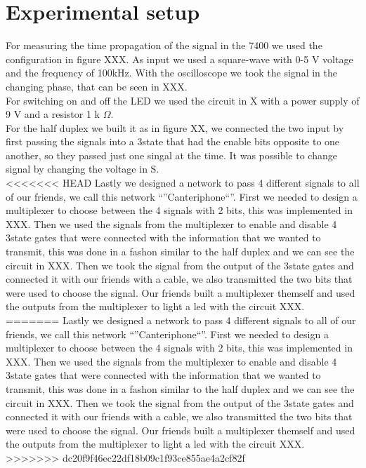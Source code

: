 \section{Experimental setup}
For measuring the time propagation of the signal in the 7400 we used the configuration in figure XXX. As input we used a square-wave with 0-5 V voltage and the frequency of 100kHz. With the oscilloscope we took the signal in the changing phase, that can be seen in XXX.\\
For switching on and off the LED we used the circuit in X with a power supply of 9 V and a resistor 1  k $\Omega$.\\
For the half duplex we built it as in figure XX, we connected the two input by first passing the signals into a  3state that had the enable bits opposite to one another, so they passed just one singal at the time. It was possible to change signal by changing the voltage in S.\\
<<<<<<< HEAD
Lastly we designed a network to pass 4 different signals to all of our friends, we call this network ``''Canteriphone``''. First we needed to design a multiplexer to choose between the 4 signals with 2 bits, this was implemented in XXX. Then we used the signals from the multiplexer to enable and disable 4 3state gates that were connected with the information that we wanted to transmit, this was done in a fashon similar to the half duplex and we can see the circuit in XXX. Then we took the signal from the output of the 3state gates and connected it with our friends with a cable, we also transmitted the two bits that were used to choose  the signal. Our friends built a multiplexer themself and used the outputs from the multiplexer to light a led with the circuit XXX.
=======
Lastly we designed a network to pass 4 different signals to all of our friends, we call this network ``''Canteriphone``''. First we needed to design a multiplexer to choose between the 4 signals with 2 bits, this was implemented in XXX. Then we used the signals from the multiplexer to enable and disable 4 3state gates that were connected with the information that we wanted to transmit, this was done in a fashon similar to the half duplex and we can see the circuit in XXX. Then we took the signal from the output of the 3state gates and connected it with our friends with a cable, we also transmitted the two bits that were used to choose  the signal. Our friends built a multiplexer themself and used the outputs from the multiplexer to light a led with the circuit XXX.
>>>>>>> dc20f9f46ec22df18b09c1f93ce855ae4a2cf82f
